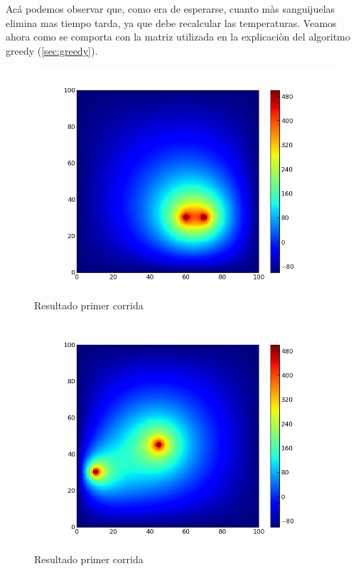 Acá podemos observar que, como era de esperarse, cuanto màs sanguijuelas elimina mas tiempo tarda, ya que debe recalcular las temperaturas.
\newpage
Veamos ahora como se comporta con la matriz utilizada en la explicaciòn del algoritmo greedy  (\ref{sec:greedy}).

\begin{figure}[htb]
\begin{center}
\includegraphics[scale=0.40]{imagenes/random_4.png} 
\caption{Resultado primer corrida} 
\end{center}
\end{figure}

\begin{figure}[htb]
\begin{center}
\includegraphics[scale=0.40]{imagenes/random_5.png} 
\caption{Resultado primer corrida} 
\end{center}
\end{figure}

